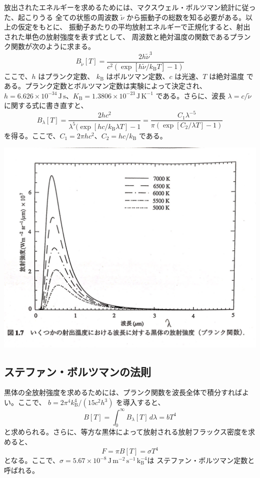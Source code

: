 \documentclass[article]{dennou777}
\newcommand{\Unit}[1]{\,\mathrm{#1}}
\begin{document}
放出されたエネルギーを求めるためには、マクスウェル・ボルツマン統計に従った、起こりうる
全ての状態の周波数 $\tilde\nu$ から振動子の総数を知る必要がある。以上の仮定をもとに、
振動子あたりの平均放射エネルギーで正規化すると、射出された単色の放射強度を表す式として、
周波数と絶対温度の関数であるプランク関数が次のように求まる。
\begin{equation}
	B_{\tilde{\nu}}[T]=\frac{2h\tilde{\nu}^3}{c^2(\exp[h\tilde{\nu}/k_\mathrm{B}T]-1)}
\end{equation}
ここで、$h$ はプランク定数、 $k_\mathrm{B}$ はボルツマン定数、$c$ は光速、$T$ は絶対温度
である。プランク定数とボルツマン定数は実験によって決定され、
$h=6.626\times10^{-34}\Unit{J\,s}$、$K_\mathrm{B}=1.3806\times10^{-23}\Unit{J\,K^{-1}}$
である。さらに、波長 $\lambda=c/\tilde\nu$ に関する式に書き直すと、
\begin{equation}
	B_\lambda[T]=\frac{2hc^2}{\lambda^5(\exp[hc/k_\mathrm{B}\lambda T]-1}=
	\frac{C_1\lambda^{-5}}{\pi(\exp[C_2/\lambda T]-1)}
\end{equation}
を得る。ここで、$C_1=2\pi hc^2$、$C_2=hc/k_\mathrm{B}$ である。

\includegraphics[width=\textwidth]{planck.jpg}

\subsection{ステファン・ボルツマンの法則}
黒体の全放射強度を求めるためには、プランク関数を波長全体で積分すればよい。ここで、
$b=2\pi^4k_\mathrm{B}^4/(15c^2h^3)$ を導入すると、
\begin{equation}
	B[T]=\int^\infty_0 B_\lambda[T]\,d\lambda=bT^4
\end{equation}
と求められる。さらに、等方な黒体によって放射される放射フラックス密度を求めると、
\begin{equation}
	F=\pi B[T]=\sigma T^4
\end{equation}
となる。ここで、$\sigma=5.67\times10^{-8}\Unit{J\,m^{-2}\,s^{-1}\,k_\mathrm{B}^{-4}}$は
ステファン・ボルツマン定数と呼ばれる。
\end{document}
